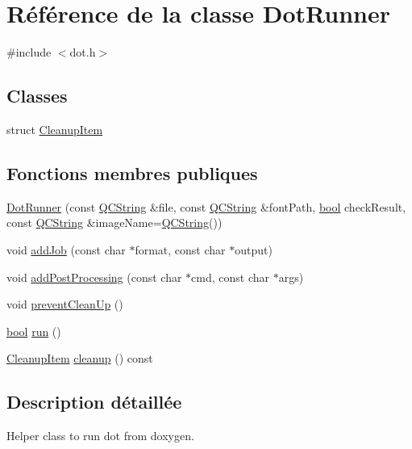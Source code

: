 \hypertarget{class_dot_runner}{}\section{Référence de la classe Dot\+Runner}
\label{class_dot_runner}


{\ttfamily \#include $<$dot.\+h$>$}

\subsection*{Classes}
\begin{DoxyCompactItemize}
\item 
struct \hyperlink{struct_dot_runner_1_1_cleanup_item}{Cleanup\+Item}
\end{DoxyCompactItemize}
\subsection*{Fonctions membres publiques}
\begin{DoxyCompactItemize}
\item 
\hyperlink{class_dot_runner_a0139716432105faf63356af65f993559}{Dot\+Runner} (const \hyperlink{class_q_c_string}{Q\+C\+String} \&file, const \hyperlink{class_q_c_string}{Q\+C\+String} \&font\+Path, \hyperlink{qglobal_8h_a1062901a7428fdd9c7f180f5e01ea056}{bool} check\+Result, const \hyperlink{class_q_c_string}{Q\+C\+String} \&image\+Name=\hyperlink{class_q_c_string}{Q\+C\+String}())
\item 
void \hyperlink{class_dot_runner_a7438f2a23b1ee231d3281a515914e4e1}{add\+Job} (const char $\ast$format, const char $\ast$output)
\item 
void \hyperlink{class_dot_runner_a84e3b1076cb4529baad7d694c35dadba}{add\+Post\+Processing} (const char $\ast$cmd, const char $\ast$args)
\item 
void \hyperlink{class_dot_runner_a2c9b6af873f263c04913504d0f420274}{prevent\+Clean\+Up} ()
\item 
\hyperlink{qglobal_8h_a1062901a7428fdd9c7f180f5e01ea056}{bool} \hyperlink{class_dot_runner_ac1afaee16ddd8bf0bc6b18aaed6b44fd}{run} ()
\item 
\hyperlink{struct_dot_runner_1_1_cleanup_item}{Cleanup\+Item} \hyperlink{class_dot_runner_ac2dc7713295b7fe7c9baabdd4fad1066}{cleanup} () const 
\end{DoxyCompactItemize}


\subsection{Description détaillée}
Helper class to run dot from doxygen. 

